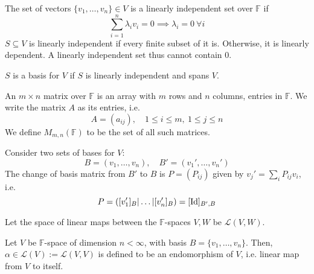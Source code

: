 \documentclass[a4paper]{article}
\begin{document}
\begin{defi}
The set of vectors $\{v_1,\dots,v_n\}\in V$ is a linearly independent set over $\mathbb{F}$ if
\begin{equation}
\sum_{i=1}^n\lambda_iv_i=0\implies\lambda_i=0~\forall i\tag{5.2}
\end{equation}
$S\subseteq V$ is linearly independent if every finite subset of it is. Otherwise, it is linearly dependent. A linearly independent set thus cannot contain 0. 
\end{defi}
\begin{defi}[Basis]
$S$ is a basis for $V$ if $S$ is linearly independent and spans $V$.
\end{defi}
\begin{defi}[Matrix]
An $m\times n$ matrix over $\mathbb{F}$ is an array with $m$ rows and $n$ columns, entries in $\mathbb{F}$. We write the matrix $A$ as its entries, i.e. 
$$A=(a_{ij}),\quad 1\leq i\leq m,~1\leq j\leq n$$
We define $M_{m,n}(\mathbb{F})$ to be the set of all such matrices.
\end{defi}
\begin{defi}
Consider two sets of bases for $V$:
$$B=(v_1,\dots,v_n),\quad B'=(v_1',\dots,v_n')$$
The change of basis matrix from $B'$ to $B$ is $P=(P_{ij})$ given by $v_j'=\sum_iP_{ij}v_i$, i.e. $$P=([v_1']_B|\dots|[v_n']_B)=[\operatorname{Id}]_{B',B}$$
\end{defi}
\begin{defi}
Let the space of linear maps between the $\mathbb{F}$-spaces $V,W$ be $\mathcal{L}(V,W)$.
\end{defi}
\begin{defi}[Endomorphisms]
Let $V$ be $\mathbb{F}$-space of dimension $n<\infty$, with basis $B=\{v_1,\dots,v_n\}$. Then, $\alpha\in\mathcal{L}(V):=\mathcal{L}(V,V)$ is defined to be an endomorphism of $V$, i.e. linear map from $V$ to itself.
\end{defi}
\end{document}
